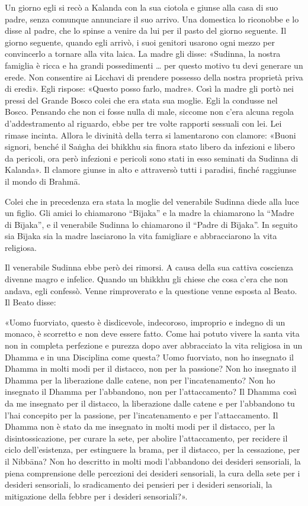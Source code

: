 Un giorno egli si recò a Kalanda con la sua ciotola e giunse alla casa di suo
padre, senza comunque annunciare il suo arrivo. Una domestica lo riconobbe e lo
disse al padre, che lo spinse a venire da lui per il pasto del giorno seguente.
Il giorno seguente, quando egli arrivò, i suoi genitori usarono ogni mezzo per
convincerlo a tornare alla vita laica. La madre gli disse: «Sudinna, la nostra
famiglia è ricca e ha grandi possedimenti … per questo motivo tu devi generare
un erede. Non consentire ai Licchavi di prendere possesso della nostra proprietà
priva di eredi». Egli rispose: «Questo posso farlo, madre». Così la madre gli
portò nei pressi del Grande Bosco colei che era stata sua moglie. Egli la
condusse nel Bosco. Pensando che non ci fosse nulla di male, siccome non c’era
alcuna regola d’addestramento al riguardo, ebbe per tre volte rapporti sessuali
con lei. Lei rimase incinta. Allora le divinità della terra si lamentarono con
clamore: «Buoni signori, benché il Saṅgha dei bhikkhu sia finora stato libero da
infezioni e libero da pericoli, ora però infezioni e pericoli sono stati in esso
seminati da Sudinna di Kalanda». Il clamore giunse in alto e attraversò tutti i
paradisi, finché raggiunse il mondo di Brahmā.

Colei che in precedenza era stata la moglie del venerabile Sudinna diede alla
luce un figlio. Gli amici lo chiamarono “Bījaka” e la madre la chiamarono la
“Madre di Bījaka”, e il venerabile Sudinna lo chiamarono il “Padre di Bījaka”.
In seguito sia Bījaka sia la madre lasciarono la vita famigliare e abbracciarono
la vita religiosa.

 Il venerabile Sudinna ebbe però dei rimorsi. A causa della
sua cattiva coscienza divenne magro e infelice. Quando un bhikkhu gli chiese che
cosa c’era che non andava, egli confessò. Venne rimproverato e la questione
venne esposta al Beato. Il Beato disse:

«Uomo fuorviato, questo è disdicevole, indecoroso, improprio e indegno di un
monaco, è scorretto e non deve essere fatto. Come hai potuto vivere la santa
vita non in completa perfezione e purezza dopo aver abbracciato la vita
religiosa in un Dhamma e in una Disciplina come questa? Uomo fuorviato, non ho
insegnato il Dhamma in molti modi per il distacco, non per la passione? Non ho
insegnato il Dhamma per la liberazione dalle catene, non per l’incatenamento?
Non ho insegnato il Dhamma per l’abbandono, non per l’attaccamento? Il Dhamma
così da me insegnato per il distacco, la liberazione dalle catene e per
l’abbandono tu l’hai concepito per la passione, per l’incatenamento e per
l’attaccamento. Il Dhamma non è stato da me insegnato in molti modi per il
distacco, per la disintossicazione, per curare la sete, per abolire
l’attaccamento, per recidere il ciclo dell’esistenza, per estinguere la brama,
per il distacco, per la cessazione, per il Nibbāna? Non ho descritto in molti
modi l’abbandono dei desideri sensoriali, la piena comprensione delle percezioni
dei desideri sensoriali, la cura della sete per i desideri sensoriali, lo
sradicamento dei pensieri per i desideri sensoriali, la mitigazione della febbre
per i desideri sensoriali?».

